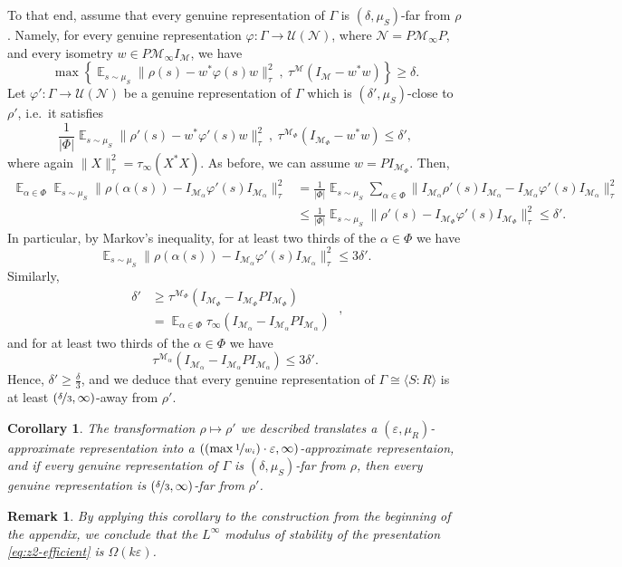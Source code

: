 \documentclass[11pt]{article}
\newtheorem{corollary}[theorem]{Corollary}
\newtheorem{remark}[theorem]{Remark}
\theoremstyle{definition}
\newcommand{\Id}{\ensuremath{I}}
\DeclareMathOperator*{\Expectation}{\mathbb{E}}
\newcommand{\mM}{\ensuremath{\mathcal{M}}}
\newcommand{\mU}{\ensuremath{\mathcal{U}}}
\newcommand{\eps}{\varepsilon}
\newcommand{\mN}{\mathcal{N}}
\begin{document}
To that end, assume that every genuine representation of $\Gamma$ is $(\delta,\mu_S)$-far from $\rho$. Namely, for every genuine representation $\varphi\colon \Gamma\to \mU(\mN)$, where $\mN=P\mM_\infty P$, and every isometry $w\in P\mM_\infty \Id_\mM$, we have 
\[
\max\left\{\Expectation_{s\sim \mu_S} \|\rho(s)-w^*\varphi(s)w\|_\tau^2\ ,\ \tau^\mM(\Id_\mM-w^*w)\right\}\geq \delta.
\]
Let $\varphi'\colon \Gamma\to \mU(\mN)$ be a genuine representation of $\Gamma$ which is $(\delta',\mu_S)$-close to $\rho'$, i.e.\ it satisfies 
\[
\frac{1}{|\Phi|}\Expectation_{s\sim \mu_S} \|\rho'(s)-w^*\varphi'(s)w\|_\tau^2\ ,\ \tau^{\mM_\Phi}(\Id_{\mM_\Phi}-w^*w)\leq  \delta',
\]
where  again  $\|X\|_\tau^2=\tau_\infty(X^*X)$.
As before, we can assume $w=PI_{\mM_\Phi}$. Then,
\[
\begin{split}
    \Expectation_{\alpha\in \Phi}\Expectation_{s\sim \mu_S} \|\rho(\alpha(s))-\Id_{\mM_\alpha}\varphi'(s)\Id_{\mM_\alpha}\|_\tau^2&=\frac{1}{|\Phi|}\Expectation_{s\sim \mu_S}\sum_{\alpha\in \Phi}\|\Id_{\mM_\alpha}\rho'(s)\Id_{\mM_\alpha}-\Id_{\mM_\alpha}\varphi'(s)\Id_{\mM_\alpha}\|_\tau^2 \\
    &\leq \frac{1}{|\Phi|}\Expectation_{s\sim \mu_S}\|\rho'(s)-\Id_{\mM_\Phi}\varphi'(s)\Id_{\mM_\Phi}\|_\tau^2\leq \delta'.
\end{split}
\]
In particular, by Markov's inequality, for at least two thirds of the $\alpha\in \Phi$ we have 
\[
\Expectation_{s\sim \mu_S} \|\rho(\alpha(s))-\Id_{\mM_\alpha}\varphi'(s)\Id_{\mM_\alpha}\|_\tau^2\leq 3\delta'.
\]
Similarly,
\[
\begin{split}
    \delta'&\geq \tau^{\mM_\Phi}(\Id_{\mM_\Phi}-\Id_{\mM_\Phi}P\Id_{\mM_\Phi})\\
    &=\Expectation_{\alpha\in\Phi}\tau_\infty(\Id_{\mM_\alpha}-\Id_{\mM_\alpha}P\Id_{\mM_\alpha})
\end{split}\;,
\]
and for at least two thirds of the $\alpha\in \Phi$ we have 
\[
\tau^{\mM_\alpha}(\Id_{\mM_\alpha}-\Id_{\mM_\alpha}P\Id_{\mM_\alpha})\leq 3\delta'.
\]
Hence, $\delta'\geq \frac{\delta}{3}$, and we deduce that every genuine representation of $\Gamma\cong \langle S\colon R\rangle$ is at least $(\nicefrac{\delta}{3},\infty)$-away from $\rho'$.
\begin{corollary}
    The transformation $\rho\mapsto\rho'$ we described  translates a $(\eps,\mu_R)$-approximate representation into a $((\max{\nicefrac{1}{w_i}})\cdot\eps,\infty)$-approximate representaion, and if every genuine representation of $\Gamma$ is $(\delta,\mu_S)$-far from $\rho$, then every genuine representation is $(\nicefrac{\delta}{3},\infty)$-far from $\rho'$.
\end{corollary}
\begin{remark}
    By applying this corollary to the construction from the beginning of the appendix, we conclude that the $L^\infty$ modulus of stability of the presentation \eqref{eq:z2-efficient} is $\Omega(k\eps)$.
\end{remark}


\notesendofpaper
\end{document}
